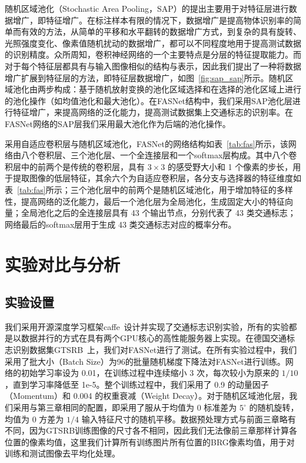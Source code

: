 随机区域池化（Stochastic Area Pooling，SAP）的提出主要用于对特征层进行数据增广，即特征增广。在标注样本有限的情况下，数据增广是提高物体识别率的简单而有效的方法，从简单的平移和水平翻转的数据增广方式，到复杂的具有旋转、光照强度变化、像素值随机扰动的数据增广，都可以不同程度地用于提高测试数据的识别精度。众所周知，卷积神经网络的一个主要特点是分层的特征提取能力。而对于每个特征层都具有与输入图像相似的结构与表示，因此我们提出了一种将数据增广扩展到特征层的方法，即特征层数据增广，如图~\ref{fig:sap_sap}所示。随机区域池化由两步构成：基于随机放射变换的池化区域选择和在选择的池化区域上进行的池化操作（如均值池化和最大池化）。在FASNet结构中，我们采用SAP池化层进行特征增广，来提高网络的泛化能力，提高测试数据集上交通标志的识别率。在FASNet网络的SAP层我们采用最大池化作为后端的池化操作。

采用自适应卷积层与随机区域池化，FASNet的网络结构如表~\ref{tab:fas}所示，该网络由八个卷积层、三个池化层、一个全连接层和一个softmax层构成。其中八个卷积层中的前两个是传统的卷积层，具有 $3{\times}3$ 的感受野大小和 1 个像素的步长，用于提取图像的低层特征，其余六个为自适应卷积层，各分支与选择器的特征维度如表~\ref{tab:fas}所示；三个池化层中的前两个是随机区域池化，用于增加特征的多样性，提高网络的泛化能力，最后一个池化层为全局池化，生成固定大小的特征向量；全局池化之后的全连接层具有 43 个输出节点，分别代表了 43 类交通标志；网络最后的softmax层用于生成 43 类交通标志对应的概率分布。


\section{实验对比与分析}
\label{sec:seg:exp}

\subsection{实验设置}

我们采用开源深度学习框架caffe~\cite{jia2014caffe}设计并实现了交通标志识别实验，所有的实验都是以数据并行的方式在具有两个GPU核心的高性能服务器上实现。在德国交通标志识别数据集GTSRB~\cite{stallkamp2012man}上，我们对FASNet进行了测试。在所有实验过程中，我们采用了批大小（Batch Size）为96的批量随机梯度下降法对FASNet进行训练。网络的初始学习率设为 0.01，在训练过程中连续缩小 3 次，每次较小为原来的 $1/10$，直到学习率降低至 1e-5。整个训练过程中，我们采用了 0.9 的动量因子（Momentum）和 0.004 的权重衰减（Weight Decay）。对于随机区域池化层，我们采用与第三章相同的配置，即采用了服从于均值为 0 标准差为 $5^{\circ}$ 的随机旋转，均值为 0 方差为 $1/4$ 输入特征尺寸的随机平移。数据预处理方式与前面三章略有不同，因为GTSRB训练图像的尺寸各不相同，因此我们无法像前三章那样计算各位置的像素均值，这里我们计算所有训练图片所有位置的BRG像素均值，用于对训练和测试图像去平均化处理。


